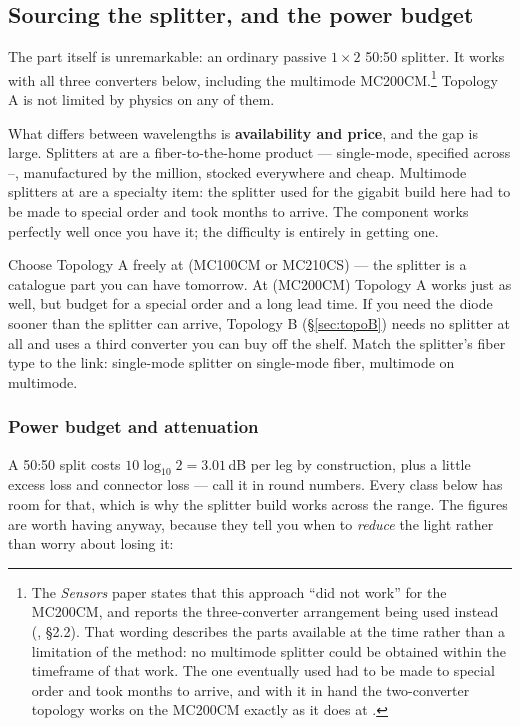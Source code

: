 \documentclass[11pt,a4paper]{article}
\begin{document}
\subsection{Sourcing the splitter, and the power budget}
\label{sec:budget}

The part itself is unremarkable: an ordinary passive $1\times2$ 50:50
splitter. It works with all three converters below, including the 
multimode MC200CM.\footnote{The \emph{Sensors} paper states that this approach
``did not work'' for the MC200CM, and reports the three-converter arrangement
being used instead (\cite{anton2024}, \S2.2). That wording describes the parts
available at the time rather than a limitation of the method: no 
multimode splitter could be obtained within the timeframe of that work. The
one eventually used had to be made to special order and took months to
arrive, and with it in hand the two-converter topology works on the MC200CM
exactly as it does at .} Topology A is not limited by physics on any
of them.

What differs between wavelengths is \textbf{availability and price}, and the
gap is large. Splitters at  are a fiber-to-the-home product ---
single-mode, specified across --, manufactured by the
million, stocked everywhere and cheap. Multimode splitters at  are a
specialty item: the  splitter used for the gigabit build here had to
be made to special order and took months to arrive. The component works
perfectly well once you have it; the difficulty is entirely in getting one.

\begin{tipbox}
Choose Topology A freely at  (MC100CM or MC210CS) --- the splitter is
a catalogue part you can have tomorrow. At  (MC200CM) Topology A works
just as well, but budget for a special order and a long lead time. If you need
the diode sooner than the splitter can arrive, Topology B
(\S\ref{sec:topoB}) needs no splitter at all and uses a third converter you
can buy off the shelf. Match the splitter's fiber type to the link:
single-mode splitter on single-mode fiber, multimode on multimode.
\end{tipbox}

\subsubsection{Power budget and attenuation}

A 50:50 split costs $10\log_{10}2 = 3.01$\,dB per leg by construction, plus a
little excess loss and connector loss --- call it  in round numbers.
Every class below has room for that, which is why the splitter build works
across the range. The figures are worth having anyway, because they tell you
when to \emph{reduce} the light rather than worry about losing it:
\end{document}
